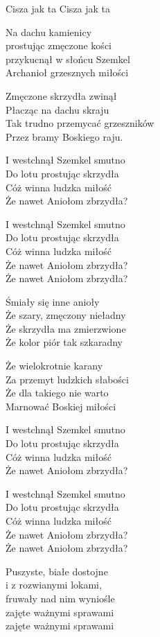 {Cisza jak ta}
{Cisza jak ta}
\begin{text}
\hfill\break
\hfill\break
Na dachu kamienicy\\
prostując zmęczone kości\\
przykucnął w słońcu Szemkel\\
Archanioł grzesznych miłości

Zmęczone skrzydła zwinął\\
Płacząc na dachu skraju\\
Tak trudno przemycać grzeszników\\
Przez bramy Boskiego raju.

\vin I westchnął Szemkel smutno\\
\vin Do lotu prostując skrzydła\\
\vin Cóż winna ludzka miłość\\
\vin Że nawet Aniołom zbrzydła?

\vin I westchnął Szemkel smutno\\
\vin Do lotu prostując skrzydła\\
\vin Cóż winna ludzka miłość\\
\vin Że nawet Aniołom zbrzydła?\\
\vin Że nawet Aniołom zbrzydła?

\hfill\break
Śmiały się inne anioły\\
Że szary, zmęczony nieładny\\
Że skrzydła ma zmierzwione\\
Że kolor piór tak szkaradny

Że wielokrotnie karany\\
Za przemyt ludzkich słabości\\
Że dla takiego nie warto\\
Marnować Boskiej miłości

\vin I westchnął Szemkel smutno\\
\vin Do lotu prostując skrzydła\\
\vin Cóż winna ludzka miłość\\
\vin Że nawet Aniołom zbrzydła?

\vin I westchnął Szemkel smutno\\
\vin Do lotu prostując skrzydła\\
\vin Cóż winna ludzka miłość\\
\vin Że nawet Aniołom zbrzydła?\\
\vin Że nawet Aniołom zbrzydła?

Puszyste, białe dostojne\\
i z rozwianymi lokami,\\
fruwały nad nim wyniośle\\
zajęte ważnymi sprawami\\
zajęte ważnymi sprawami


\end{text}
